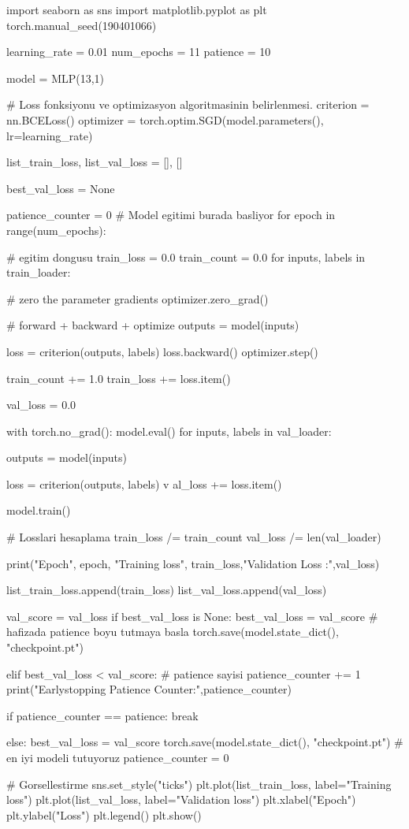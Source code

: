 \documentclass[11pt]{article}
\begin{document}
\begin{python}
import seaborn as sns
import matplotlib.pyplot as plt
torch.manual_seed(190401066)

learning_rate = 0.01
num_epochs = 11
patience = 10


model = MLP(13,1)

# Loss fonksiyonu ve optimizasyon algoritmasinin belirlenmesi.
criterion = nn.BCELoss()
optimizer = torch.optim.SGD(model.parameters(), lr=learning_rate)

list_train_loss, list_val_loss = [], []

best_val_loss = None

patience_counter = 0
# Model egitimi burada basliyor
for epoch in range(num_epochs):

	# egitim dongusu
	train_loss = 0.0
	train_count = 0.0
	for inputs, labels in train_loader:


		# zero the parameter gradients
		optimizer.zero_grad()

		# forward + backward + optimize
		outputs = model(inputs)

		loss = criterion(outputs, labels)
		loss.backward()
		optimizer.step()

		train_count += 1.0
		train_loss += loss.item()


	val_loss = 0.0

	with torch.no_grad():
		model.eval()
		for inputs, labels in val_loader:

			outputs = model(inputs)

			loss = criterion(outputs, labels)
v			al_loss += loss.item()


	model.train()

	# Losslari hesaplama
	train_loss /= train_count
	val_loss /= len(val_loader)

	print("Epoch", epoch, "Training loss", train_loss,"Validation Loss :",val_loss)

	list_train_loss.append(train_loss)
	list_val_loss.append(val_loss)

	val_score = val_loss
	if best_val_loss is None:
		best_val_loss = val_score # hafizada patience boyu tutmaya basla
		torch.save(model.state_dict(), "checkpoint.pt")
		
	elif best_val_loss < val_score: # patience sayisi
		patience_counter += 1
		print("Earlystopping Patience Counter:",patience_counter)
		
	if patience_counter == patience:
		break
		
	else:
		best_val_loss = val_score
		torch.save(model.state_dict(), "checkpoint.pt") # en iyi modeli tutuyoruz
		patience_counter = 0

# Gorsellestirme
sns.set_style("ticks")
plt.plot(list_train_loss, label="Training loss")
plt.plot(list_val_loss, label="Validation loss")
plt.xlabel("Epoch")
plt.ylabel("Loss")
plt.legend()
plt.show()
\end{python}
\end{document}
